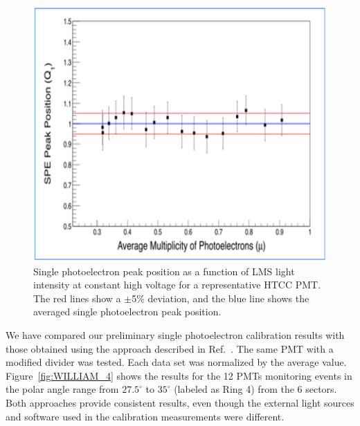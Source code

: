 \begin{figure}[ht]
\centering
\includegraphics[width=0.99\linewidth]{images/WILLIAM_5.png}
\caption{Single photoelectron peak position as a function of LMS light intensity at constant high voltage for a
  representative HTCC PMT. The red lines show a $\pm$5\% deviation, and the blue line shows the averaged
  single photoelectron peak position.}
\label{fig:WILLIAM_5}
\end{figure}

We have compared our preliminary single photoelectron calibration results with those obtained using the
approach described in Ref.~\cite{degtiarenko2017}. The same PMT with a modified divider was tested. Each data
set was normalized by the average value. Figure~\ref{fig:WILLIAM_4} shows the results for the 12 PMTs monitoring
events in the polar angle range from $27.5^\circ$ to $35^\circ$ (labeled as Ring 4) from the 6 sectors. Both approaches
provide consistent results, even though the external light sources and software used in the calibration measurements
were different.

